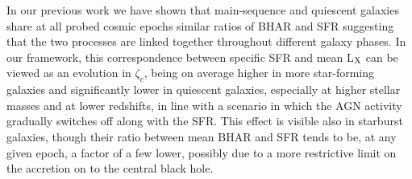 In our previous work  \citep[see, e.g., Fig.~3 in][]{2020A&A...642A..65C} we have shown that main-sequence and quiescent galaxies share at all probed cosmic epochs similar ratios of BHAR and SFR suggesting that the two processes are linked together throughout different galaxy phases.  
In our framework, this correspondence between specific SFR and mean L$_{\rm X}$ can be viewed as an evolution in $\zeta_c$, being on average higher in more star-forming galaxies and significantly lower in quiescent galaxies, especially at higher stellar masses and at lower redshifts, in line with a scenario in which the AGN activity gradually switches off along with the SFR. This effect is visible also in starburst galaxies, though their ratio between mean BHAR and SFR tends to be, at any given epoch, a factor of a few lower, possibly due to a more restrictive limit on the accretion on to the central black hole.

